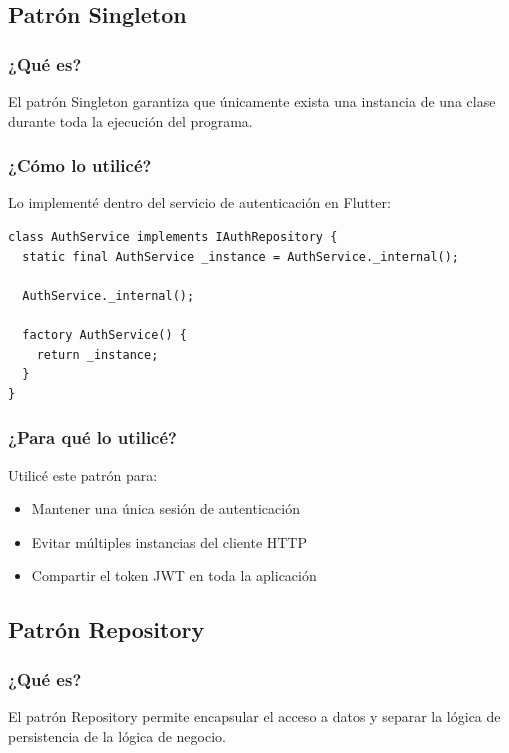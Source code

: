 \documentclass[12pt,a4paper]{article}
\begin{document}
\subsection{Patrón Singleton}

\subsubsection{¿Qué es?}

El patrón Singleton garantiza que únicamente exista una instancia de una clase durante toda la ejecución del programa.

\subsubsection{¿Cómo lo utilicé?}

Lo implementé dentro del servicio de autenticación en Flutter:

\begin{lstlisting}
class AuthService implements IAuthRepository {
  static final AuthService _instance = AuthService._internal();

  AuthService._internal();

  factory AuthService() {
    return _instance;
  }
}
\end{lstlisting}

\subsubsection{¿Para qué lo utilicé?}

Utilicé este patrón para:

\begin{itemize}
    \item Mantener una única sesión de autenticación
    \item Evitar múltiples instancias del cliente HTTP
    \item Compartir el token JWT en toda la aplicación
\end{itemize}

\subsection{Patrón Repository}

\subsubsection{¿Qué es?}

El patrón Repository permite encapsular el acceso a datos y separar la lógica de persistencia de la lógica de negocio.
\end{document}
